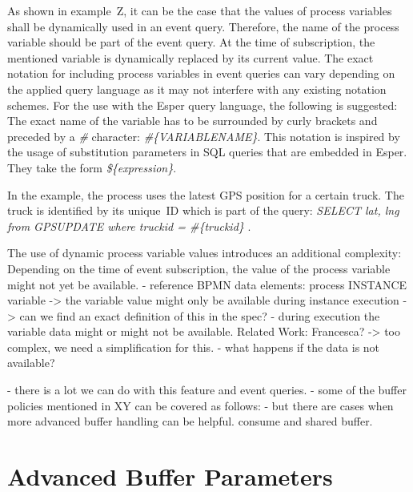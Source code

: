 

As shown in example~Z, it can be the case that the values of process variables shall be dynamically used in an event query.
Therefore, the name of the process variable should be part of the event query. At the time of subscription, the mentioned variable is dynamically replaced by its current value.
The exact notation for including process variables in event queries can vary depending on the applied query language as it may not interfere with any existing notation schemes.
For the use with the Esper query language, the following is suggested: The exact name of the variable has to be surrounded by curly brackets and preceded by a \textit{\#} character: \textit{\#\{VARIABLENAME\}}.
This notation is inspired by the usage of substitution parameters in SQL queries that are embedded in Esper. They take the form \textit{\$\{expression\}}.

In the example, the process uses the latest GPS position for a certain truck. The truck is identified by its unique~ID which is part of the query: \textit{SELECT lat, lng from GPSUPDATE where truckid = \#\{truckid\} }.

The use of dynamic process variable values introduces an additional complexity: Depending on the time of event subscription, the value of the process variable might not yet be available.
- reference BPMN data elements: process INSTANCE variable
-> the variable value might only be available during instance execution
-> can we find an exact definition of this in the spec?
- during execution the variable data might or might not be available. Related Work: Francesca?
-> too complex, we need a simplification for this.
- what happens if the data is not available?








- there is a lot we can do with this feature and event queries.
- some of the buffer policies mentioned in XY can be covered as follows:
- but there are cases when more advanced buffer handling can be helpful. consume and shared buffer.


\section{Advanced Buffer Parameters}










